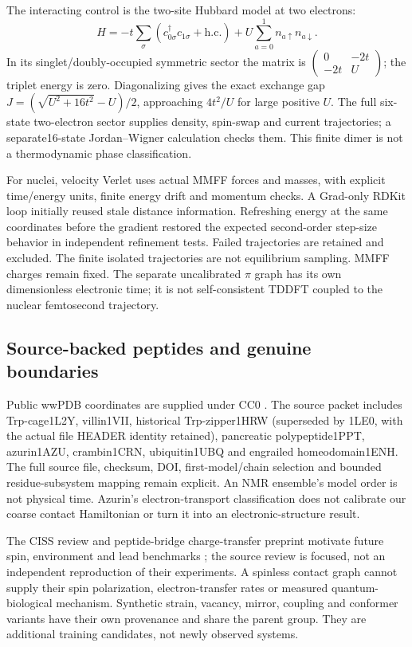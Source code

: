 \documentclass[11pt,oneside,openany]{book}
\theoremstyle{definition}\newtheorem{definition}[theorem]{Definition}
\theoremstyle{remark}\newtheorem{remark}[theorem]{Remark}
\begin{document}
The interacting control is the two-site Hubbard model at two electrons:
\[
 H=-t\sum_\sigma(c_{0\sigma}^\dagger c_{1\sigma}+\mathrm{h.c.})
   +U\sum_{a=0}^1n_{a\uparrow}n_{a\downarrow}.
\]
In its singlet/doubly-occupied symmetric sector the matrix is
$\left(\begin{smallmatrix}0&-2t\\-2t&U\end{smallmatrix}\right)$;
the triplet energy is zero. Diagonalizing gives the exact exchange gap
$J=(\sqrt{U^2+16t^2}-U)/2$, approaching $4t^2/U$ for large positive $U$.
The full six-state two-electron sector supplies density, spin-swap and current
trajectories; a separate16-state Jordan--Wigner calculation checks them.
This finite dimer is not a thermodynamic phase classification.

For nuclei, velocity Verlet uses actual MMFF forces and masses, with explicit
time/energy units, finite energy drift and momentum checks. A Grad-only RDKit
loop initially reused stale distance information. Refreshing energy at the same
coordinates before the gradient restored the expected second-order step-size
behavior in independent refinement tests. Failed trajectories are retained and
excluded. The finite isolated trajectories are not equilibrium sampling.
MMFF charges remain fixed. The separate uncalibrated $\pi$ graph has its own
dimensionless electronic time; it is not self-consistent TDDFT coupled to the
nuclear femtosecond trajectory.

\subsection{Source-backed peptides and genuine boundaries}
Public wwPDB coordinates are supplied under CC0 \cite{DSPDB}. The source packet
includes Trp-cage1L2Y, villin1VII, historical Trp-zipper1HRW (superseded by
1LE0, with the actual file HEADER identity retained), pancreatic polypeptide1PPT,
azurin1AZU, crambin1CRN, ubiquitin1UBQ and engrailed homeodomain1ENH.
The full source file, checksum, DOI, first-model/chain selection and bounded
residue-subsystem mapping remain explicit. An NMR ensemble's model order is
not physical time. Azurin's electron-transport classification does not calibrate
our coarse contact Hamiltonian or turn it into an electronic-structure result.

The CISS review and peptide-bridge charge-transfer preprint motivate future
spin, environment and lead benchmarks \cite{DSCISS,DSBridge}; the source review is
focused, not an independent reproduction of their experiments. A spinless
contact graph cannot supply their spin polarization, electron-transfer rates
or measured quantum-biological mechanism. Synthetic strain, vacancy, mirror,
coupling and conformer variants have their own provenance and share the parent
group. They are additional training candidates, not newly observed systems.
\end{document}
